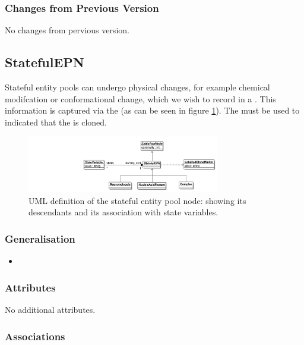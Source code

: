 \subsubsection{Changes from Previous Version}

No changes from pervious version.

\subsection{StatefulEPN}
\label{defn:StatefulEPN}

Stateful entity pools can undergo physical changes, for example
chemical modifcation or conformational change, which we wish to record
in a \PDm. This information is captured via the
 (as can be seen in figure
\ref{fig:statefulepnuml}). The  must be
used to indicated that the  is cloned.

\begin{figure}[htb]
  \centering
  \includegraphics[width=0.75\textwidth]{images/statefulepnuml}
\caption{UML definition of the stateful entity pool node: showing its
  descendants and its association with state variables.}
  \label{fig:statefulepnuml}
\end{figure}

\subsubsection{Generalisation}

\begin{itemize}
\item {}
\end{itemize}

\subsubsection{Attributes}

No additional attributes.

\subsubsection{Associations}


